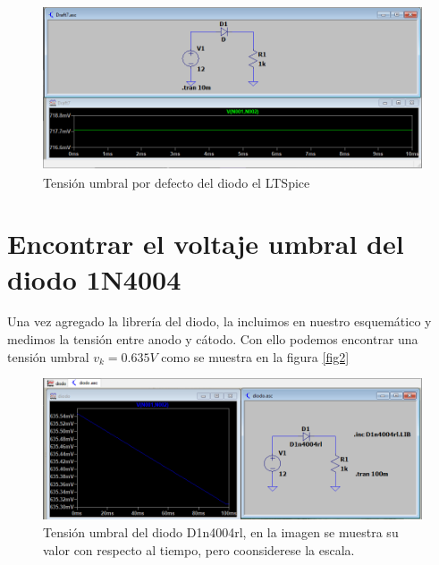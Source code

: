 \documentclass[a4paper]{article} %
\begin{document}
\begin{figure} %
	\centering %
	\includegraphics[scale=0.5]{IMAGENES/fig1} %
	\caption{Tensión umbral por defecto del diodo el LTSpice} %
	\label{fig1} %
\end{figure} %

\section{Encontrar el voltaje umbral del diodo 1N4004}

Una vez agregado la librería del diodo, la incluimos en nuestro esquemático y medimos la tensión entre anodo y cátodo. Con ello podemos encontrar una tensión umbral $v_k = 0.635V$ como se muestra en la figura \eqref{fig2}

\begin{figure} %
	\centering %
	\includegraphics[scale=0.5]{IMAGENES/fig2} %
	\caption{Tensión umbral del diodo D1n4004rl, en la imagen se muestra su valor con respecto al tiempo, pero coonsiderese la escala.} %
	\label{fig2} %
\end{figure} %
\end{document}
